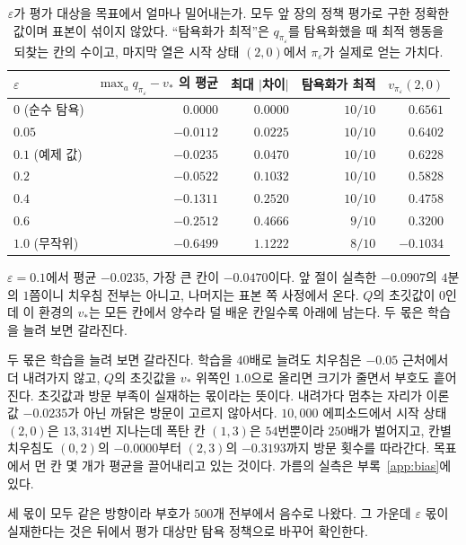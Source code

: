 \documentclass[11pt,a4paper]{article}
\begin{document}
\begin{table}[htbp]
\centering
\caption{$\varepsilon$가 평가 대상을 목표에서 얼마나 밀어내는가. 모두 앞 장의 정책 평가로 구한
정확한 값이며 표본이 섞이지 않았다. ``탐욕화가 최적''은 $q_{\pi_\varepsilon}$를 탐욕화했을 때 최적
행동을 되찾는 칸의 수이고, 마지막 열은 시작 상태 $(2,0)$에서 $\pi_\varepsilon$가 실제로 얻는
가치다.}
\label{tab:eps-gap}
\small
\begin{tabular}{@{}lrrrr@{}}
\toprule
$\varepsilon$ & $\max_a q_{\pi_\varepsilon} - v_*$ 의 평균 & 최대 $|$차이$|$ & 탐욕화가 최적 & $v_{\pi_\varepsilon}(2,0)$ \\
\midrule
$0$ (순수 탐욕) & $\phantom{-}0.0000$ & $0.0000$ & $10/10$ & $\phantom{-}0.6561$ \\
$0.05$          & $-0.0112$ & $0.0225$ & $10/10$ & $\phantom{-}0.6402$ \\
$0.1$ (예제 값) & $-0.0235$ & $0.0470$ & $10/10$ & $\phantom{-}0.6228$ \\
$0.2$           & $-0.0522$ & $0.1032$ & $10/10$ & $\phantom{-}0.5828$ \\
$0.4$           & $-0.1311$ & $0.2520$ & $10/10$ & $\phantom{-}0.4758$ \\
$0.6$           & $-0.2512$ & $0.4666$ & $9/10$  & $\phantom{-}0.3200$ \\
$1.0$ (무작위)  & $-0.6499$ & $1.1222$ & $8/10$  & $-0.1034$ \\
\bottomrule
\end{tabular}
\end{table}

$\varepsilon=0.1$에서 평균 $-0.0235$, 가장 큰 칸이 $-0.0470$이다. 앞 절이 실측한 $-0.0907$의
$4$분의 $1$쯤이니 치우침 전부는 아니고, 나머지는 표본 쪽 사정에서 온다. $Q$의 초깃값이 $0$인데 이
환경의 $v_*$는 모든 칸에서 양수라 덜 배운 칸일수록 아래에 남는다. 두 몫은 학습을 늘려 보면
갈라진다.

두 몫은 학습을 늘려 보면 갈라진다. 학습을 $40$배로 늘려도 치우침은 $-0.05$ 근처에서 더 내려가지
않고, $Q$의 초깃값을 $v_*$ 위쪽인 $1.0$으로 올리면 크기가 줄면서 부호도 흩어진다. 초깃값과 방문
부족이 실재하는 몫이라는 뜻이다. 내려가다 멈추는 자리가 이론값 $-0.0235$가 아닌 까닭은 방문이
고르지 않아서다. $10{,}000$ 에피소드에서 시작 상태 $(2,0)$은 $13{,}314$번 지나는데 폭탄 칸
$(1,3)$은 $54$번뿐이라 $250$배가 벌어지고, 칸별 치우침도 $(0,2)$의 $-0.0000$부터 $(2,3)$의
$-0.3193$까지 방문 횟수를 따라간다. 목표에서 먼 칸 몇 개가 평균을 끌어내리고 있는 것이다. 가름의
실측은 부록~\ref{app:bias}에 있다.

세 몫이 모두 같은 방향이라 부호가 $500$개 전부에서 음수로 나왔다. 그 가운데 $\varepsilon$ 몫이
실재한다는 것은 뒤에서 평가 대상만 탐욕 정책으로 바꾸어 확인한다.
\end{document}
